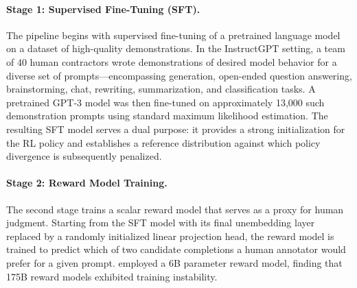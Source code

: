 \paragraph{Stage 1: Supervised Fine-Tuning (SFT).}
The pipeline begins with supervised fine-tuning of a pretrained language model on a dataset of high-quality demonstrations. In the InstructGPT setting, a team of 40 human contractors wrote demonstrations of desired model behavior for a diverse set of prompts---encompassing generation, open-ended question answering, brainstorming, chat, rewriting, summarization, and classification tasks. A pretrained GPT-3 model was then fine-tuned on approximately 13,000 such demonstration prompts using standard maximum likelihood estimation. The resulting SFT model serves a dual purpose: it provides a strong initialization for the RL policy and establishes a reference distribution against which policy divergence is subsequently penalized.

\paragraph{Stage 2: Reward Model Training.}
The second stage trains a scalar reward model that serves as a proxy for human judgment. Starting from the SFT model with its final unembedding layer replaced by a randomly initialized linear projection head, the reward model is trained to predict which of two candidate completions a human annotator would prefer for a given prompt. \cite{ouyang2022instructgpt} employed a 6B parameter reward model, finding that 175B reward models exhibited training instability.

